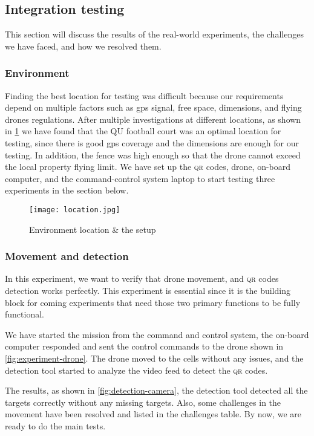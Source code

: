 \documentclass[../main.tex]{subfiles}
\begin{document}
\subsection{Integration testing}
This section will discuss the results of the 
real-world experiments, the challenges we have faced,
and how we resolved them.
\subsubsection{Environment}
Finding the best location for testing was difficult
because our requirements depend on multiple factors 
such as \gls{gps} signal, free space, dimensions,
and flying drones regulations. After multiple investigations
at different locations, as shown in \cref{fig:testing-location}
we have found that the QU football court was an optimal location
for testing, since there is good \gls{gps} coverage and the dimensions are
enough for our testing. In addition, the fence was high enough so that
the drone cannot exceed the local property flying limit.
We have set up the \textsc{qr} codes, drone, on-board computer, 
and the command-control
system laptop to start testing three experiments in the section below.

\begin{figure}[H]
	\centering
	\texttt{[image: location.jpg]}
	\caption{Environment location \& the setup}
	\label{fig:testing-location}
\end{figure} 
\subsubsection{Movement and detection}
In this experiment, we want to verify that drone movement, and
\textsc{qr} codes detection works perfectly. This experiment is 
essential since it is the building block for coming experiments
that need those two primary functions to be fully functional.

We have started the mission from the command and control system, 
the on-board computer responded and sent the control commands 
to the drone shown in \cref{fig:experiment-drone}.
The drone moved to the cells without any issues,
and the detection tool started to analyze 
the video feed to detect the \textsc{qr} codes.

The results, as shown in \cref{fig:detection-camera}, 
the detection tool detected all the targets correctly 
without any missing targets. Also, some challenges 
in the movement have been resolved and listed in 
the challenges table. By now, we are ready to do the main tests.
\end{document}
